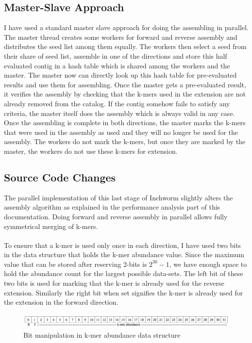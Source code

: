 \label{key}\documentclass[bachinf, english ,zihtitle,final,hyperref,utf8]{zihpub}
\begin{document}
\subsection{Master-Slave Approach}
I have used a standard master slave approach for doing the assembling in parallel. The master thread creates some workers for forward and reverse assembly and distributes the seed list among them equally. The workers then select a seed from their share of seed list, assemble in one of the directions and store this half evaluated contig in a hash table which is shared among the workers and the master. The master now can directly look up this hash table for pre-evaluated results and use them for assembling. Once the master gets a pre-evaluated result, it verifies the assembly by checking that the k-mers used in the extension are not already removed from the catalog. If the contig somehow fails to satisfy any criteria, the master itself does the assembly which is always valid in any case. Once the assembling is complete in both directions, the master marks the k-mers that were used in the assembly as used and they will no longer be used for the assembly. The workers do not mark the k-mers, but once they are marked by the master, the workers do not use these k-mers for extension.
\subsection{Source Code Changes}
The parallel implementation of this last stage of Inchworm slightly alters the assembly algorithm as explained in the performance analysis part of this documentation. Doing forward and reverse assembly in parallel allows fully symmetrical merging of k-mers. 
\paragraph{}
To ensure that a k-mer is used only once in each direction, I have used two bits in the data structure that holds the k-mer abundance value. Since the maximum value that can be stored after reserving 2-bits is $2^{30}-1$, we have enough space to hold the abundance count for the largest possible data-sets. The left bit of these two bits is used for marking that the k-mer is already used for the reverse extension. Similarly the right bit when set signifies the k-mer is already used for the extension in the forward direction.
\begin{figure}[h]
\center
\includegraphics[scale=0.5]{bit}
\caption{Bit manipulation in k-mer abundance data structure}
\label{bit}
\end{figure}
\end{document}
